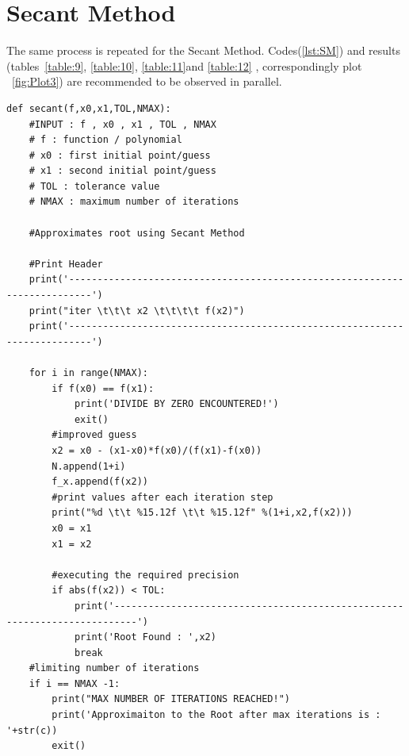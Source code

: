 \documentclass[a4paper, 12pt]{report}
\begin{document}
\section{Secant Method}
The same process is repeated for the Secant Method. Codes(\ref{lst:SM}) and results (tables~\ref{table:9}, \ref{table:10}, \ref{table:11}and \ref{table:12} , correspondingly plot ~\ref{fig:Plot3}) are recommended to be observed in parallel.
\begin{lstlisting}
def secant(f,x0,x1,TOL,NMAX):
    #INPUT : f , x0 , x1 , TOL , NMAX
    # f : function / polynomial
    # x0 : first initial point/guess
    # x1 : second initial point/guess
    # TOL : tolerance value
    # NMAX : maximum number of iterations

    #Approximates root using Secant Method

    #Print Header
    print('--------------------------------------------------------------------------')
    print("iter \t\t\t x2 \t\t\t\t f(x2)")
    print('--------------------------------------------------------------------------')
    
    for i in range(NMAX):
        if f(x0) == f(x1):
            print('DIVIDE BY ZERO ENCOUNTERED!')
            exit()
        #improved guess
        x2 = x0 - (x1-x0)*f(x0)/(f(x1)-f(x0))
        N.append(1+i)
        f_x.append(f(x2))
        #print values after each iteration step
        print("%d \t\t %15.12f \t\t %15.12f" %(1+i,x2,f(x2)))
        x0 = x1
        x1 = x2

        #executing the required precision
        if abs(f(x2)) < TOL:
            print('--------------------------------------------------------------------------')
            print('Root Found : ',x2)
            break
    #limiting number of iterations
    if i == NMAX -1:
        print("MAX NUMBER OF ITERATIONS REACHED!")
        print('Approximaiton to the Root after max iterations is : '+str(c))        
        exit()
\end{lstlisting}
\end{document}
